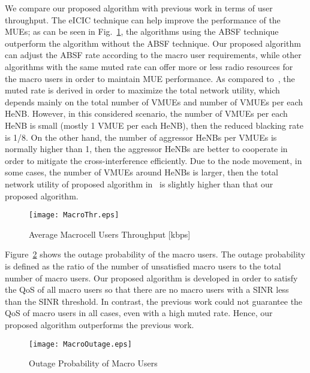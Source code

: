 \documentclass[paper]{ieice}
\begin{document}
We compare our proposed algorithm with previous work in terms of user throughput. The eICIC technique can help improve the performance of the MUEs; as can be seen in Fig.~\ref{fig:M-Thr-Macro}, the algorithms using the ABSF technique outperform the algorithm without the ABSF technique. Our proposed algorithm can adjust the ABSF rate according to the macro user requirements, while other algorithms with the same muted rate can offer more or less radio resources for the macro users in order to maintain MUE performance. As compared to~\cite{Kamel2013}, the muted rate is derived in order to maximize the total network utility, which depends mainly on the total number of VMUEs and number of VMUEs per each HeNB. However, in this considered scenario, the number of VMUEs per each HeNB is small (mostly 1 VMUE per each HeNB), then the reduced blacking rate is 1/8. On the other hand, the number of aggressor HeNBs per VMUEs is normally higher than 1, then the aggressor HeNBs are better to cooperate in order to mitigate the cross-interference efficiently. Due to the node movement, in some cases, the number of VMUEs around HeNBs is larger, then the total network utility of proposed algorithm in~\cite{Kamel2013} is slightly higher than that our proposed algorithm.
\begin{figure}[t]
        \centering
        \texttt{[image: MacroThr.eps]}
        \caption{Average Macrocell Users Throughput [kbps]}
        \label{fig:M-Thr-Macro}
\end{figure}

Figure~\ref{fig:M-Outage_M} shows the outage probability of the macro users. The outage probability is defined as the ratio of the number of unsatisfied macro users to the total number of macro users. Our proposed algorithm is developed in order to satisfy the QoS of all macro users so that there are no macro users with a SINR less than the SINR threshold. In contrast, the previous work could not guarantee the QoS of macro users in all cases, even with a high muted rate. Hence, our proposed algorithm outperforms the previous work.
\begin{figure}[t]
        \centering
      \texttt{[image: MacroOutage.eps]}
      \caption{Outage Probability of Macro Users}
      \label{fig:M-Outage_M}
\end{figure}
\end{document}
